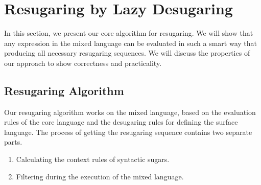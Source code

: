 
\section{Resugaring by Lazy Desugaring}
\label{sec:algo}

In this section, we present our core algorithm for resugaring.  We will show that any expression in the mixed language can be evaluated in such a smart way that producing all necessary resugaring sequences. We will discuss the properties of our approach to show correctness and practicality.




\subsection{Resugaring Algorithm}

Our resugaring algorithm works on the mixed language, based on the evaluation rules of the core language and the desugaring rules for defining the surface language. The process of getting the resugaring sequence contains two separate parts.

\begin{enumerate}
\item Calculating the context rules of syntactic sugars.
\item Filtering  during the execution of the mixed language.
\end{enumerate}



